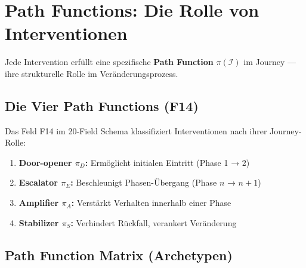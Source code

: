 \section{Path Functions: Die Rolle von Interventionen}
\label{sec:18-path}

Jede Intervention erfüllt eine spezifische \textbf{Path Function} $\pi(\mathcal{I})$ im Journey --- ihre strukturelle Rolle im Veränderungsprozess.

\subsection{Die Vier Path Functions (F14)}

\begin{definition}
\label{def:18-path-functions}
Das Feld F14 im 20-Field Schema klassifiziert Interventionen nach ihrer Journey-Rolle:
\begin{enumerate}
\item \textbf{Door-opener $\pi_D$:} Ermöglicht initialen Eintritt (Phase 1 → 2)
\item \textbf{Escalator $\pi_E$:} Beschleunigt Phasen-Übergang (Phase $n$ → $n+1$)
\item \textbf{Amplifier $\pi_A$:} Verstärkt Verhalten innerhalb einer Phase
\item \textbf{Stabilizer $\pi_S$:} Verhindert Rückfall, verankert Veränderung
\end{enumerate}
\end{definition}

\subsection{Path Function Matrix (Archetypen)}

